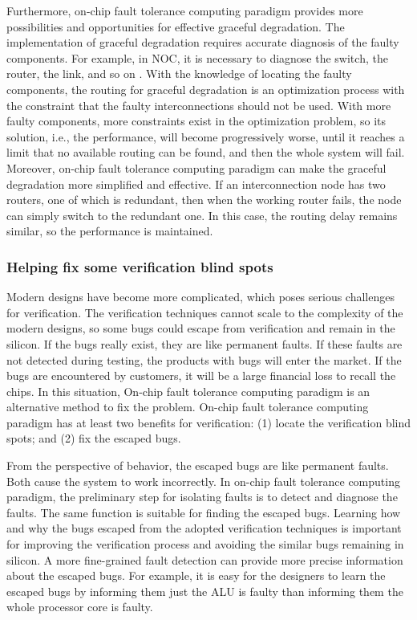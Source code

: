 Furthermore, on-chip fault tolerance computing paradigm provides more possibilities and opportunities for effective graceful degradation. The implementation of graceful degradation requires accurate diagnosis of the faulty components. For example, in NOC, it is necessary to diagnose the switch, the router, the link, and so on \cite{kohler2010fault}. With the knowledge of locating the faulty components, the routing for graceful degradation is an optimization process with the constraint that the faulty interconnections should not be used. With more faulty components, more constraints exist in the optimization problem, so its solution, i.e., the performance, will become progressively worse, until it reaches a limit that no available routing can be found, and then the whole system will fail. 
Moreover, on-chip fault tolerance computing paradigm can make the graceful degradation more simplified and effective. If an interconnection node has two routers, one of which is redundant, then when the working router fails, the node can simply switch to the redundant one. In this case, the routing delay remains similar, so the performance is maintained.

\subsubsection{Helping fix some verification blind spots}
Modern designs have become more complicated, which poses serious challenges for verification. The verification techniques cannot scale to the complexity of the modern designs, so some bugs could escape from verification and remain in the silicon. If the bugs really exist, they are like permanent faults. If these faults are not detected during testing, the products with bugs will enter the market. If the bugs are encountered by customers, it will be a large financial loss to recall the chips. In this situation, On-chip fault tolerance computing paradigm is an alternative method to fix the problem. On-chip fault tolerance computing paradigm has at least two benefits for verification: (1) locate the verification blind spots; and (2) fix the escaped bugs.

From the perspective of behavior, the escaped bugs are like permanent faults. Both cause the system to work incorrectly. In on-chip fault tolerance computing paradigm, the preliminary step for isolating faults is to detect and diagnose the faults. The same function is suitable for finding the escaped bugs. Learning how and why the bugs escaped from the adopted verification techniques is important for improving the verification process and avoiding the similar bugs remaining in silicon. A more fine-grained fault detection can provide more precise information about the escaped bugs. For example, it is easy for the designers to learn the escaped bugs by informing them just the ALU is faulty than informing them the whole processor core is faulty.

